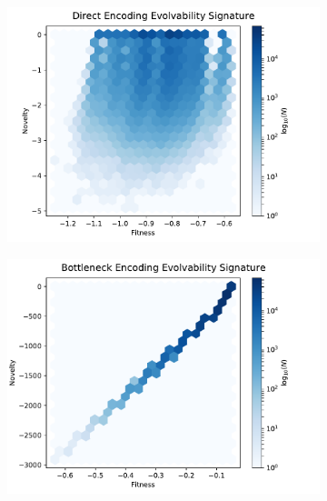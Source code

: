 \begin{figure}
        \begin{subfigure}[b]{0.33\textwidth}
                \includegraphics[width=\linewidth]{img/direct_es_unscaled}
        \end{subfigure}%
        \begin{subfigure}[b]{0.33\textwidth}
                \includegraphics[width=\linewidth]{img/bottleneck_es_unscaled}
        \end{subfigure}%
        \begin{subfigure}[b]{0.33\textwidth}

\end{subfigure}
\end{figure}
